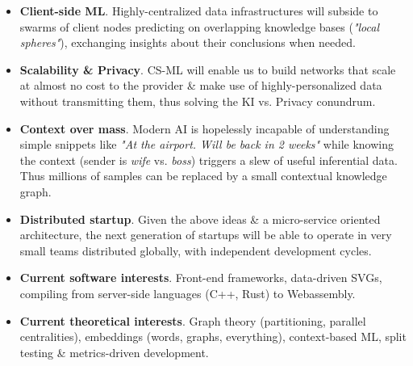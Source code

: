 \documentclass[a4paper]{twentysecondcv} %
\begin{document}
\begin{itemize}	
	\item \textbf{Client-side ML}. Highly-centralized data infrastructures will subside to swarms of client nodes predicting on overlapping knowledge bases (\emph{"local spheres"}), exchanging insights about their conclusions when needed.
	
	\item \textbf{Scalability \& Privacy}. CS-ML will enable us to build networks that scale at almost no cost to the provider \& make use of highly-personalized data without transmitting them, thus solving the KI vs. Privacy conundrum.
	
	\item \textbf{Context over mass}. Modern AI is hopelessly incapable of understanding simple snippets like \emph{"At the airport. Will be back in 2 weeks"} while knowing the context (sender is \emph{wife} vs. \emph{boss}) triggers a slew of useful inferential data. Thus millions of samples can be replaced by a small contextual knowledge graph.
	
	\item \textbf{Distributed startup}. Given the above ideas \& a micro-service oriented architecture, the next generation of startups will be able to operate in very small teams distributed globally, with independent development cycles.
	
	\item \textbf{Current software interests}. Front-end frameworks, data-driven SVGs, compiling from server-side languages (C++, Rust) to Webassembly.
	
	\item \textbf{Current theoretical interests}. Graph theory (partitioning, parallel centralities), embeddings (words, graphs, everything), context-based ML, split testing \& metrics-driven development.
	
\end{itemize}





\end{document}
